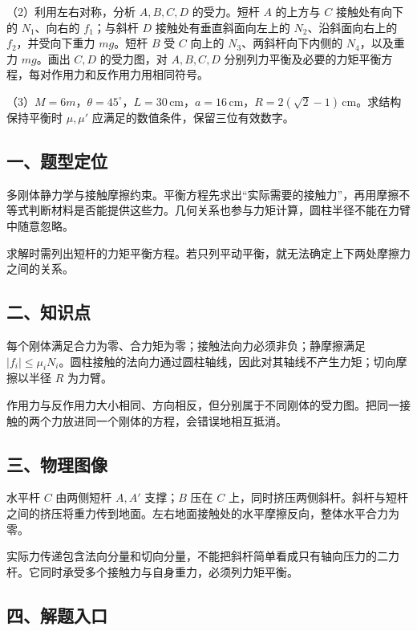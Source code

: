 \documentclass[12pt,a4paper,fontset=fandol]{ctexart}
\begin{document}
（2）利用左右对称，分析 \(A,B,C,D\) 的受力。短杆 \(A\) 的上方与 \(C\)
接触处有向下的 \(N_1\)、向右的 \(f_1\)；与斜杆 \(D\)
接触处有垂直斜面向左上的 \(N_2\)、沿斜面向右上的 \(f_2\)，并受向下重力
\(mg\)。短杆 \(B\) 受 \(C\) 向上的 \(N_3\)、两斜杆向下内侧的
\(N_4\)，以及重力 \(mg\)。画出 \(C,D\) 的受力图，对 \(A,B,C,D\)
分别列力平衡及必要的力矩平衡方程，每对作用力和反作用力用相同符号。

（3）\(M=6m\)，\(\theta=45^\circ\)，\(L=30\,\mathrm{cm}\)，\(a=16\,\mathrm{cm}\)，\(R=2(\sqrt2-1)\,\mathrm{cm}\)。求结构保持平衡时
\(\mu,\mu'\) 应满足的数值条件，保留三位有效数字。

\subsection{一、题型定位}\label{ux4e00ux9898ux578bux5b9aux4f4d-3}

多刚体静力学与接触摩擦约束。平衡方程先求出``实际需要的接触力''，再用摩擦不等式判断材料是否能提供这些力。几何关系也参与力矩计算，圆柱半径不能在力臂中随意忽略。

求解时需列出短杆的力矩平衡方程。若只列平动平衡，就无法确定上下两处摩擦力之间的关系。

\subsection{二、知识点}\label{ux4e8cux77e5ux8bc6ux70b9-3}

每个刚体满足合力为零、合力矩为零；接触法向力必须非负；静摩擦满足
\(|f_i|\le\mu_iN_i\)。圆柱接触的法向力通过圆柱轴线，因此对其轴线不产生力矩；切向摩擦以半径
\(R\) 为力臂。

作用力与反作用力大小相同、方向相反，但分别属于不同刚体的受力图。把同一接触的两个力放进同一个刚体的方程，会错误地相互抵消。

\subsection{三、物理图像}\label{ux4e09ux7269ux7406ux56feux50cf-3}

水平杆 \(C\) 由两侧短杆 \(A,A'\) 支撑；\(B\) 压在 \(C\)
上，同时挤压两侧斜杆。斜杆与短杆之间的挤压将重力传到地面。左右地面接触处的水平摩擦反向，整体水平合力为零。

实际力传递包含法向分量和切向分量，不能把斜杆简单看成只有轴向压力的二力杆。它同时承受多个接触力与自身重力，必须列力矩平衡。

\subsection{四、解题入口}\label{ux56dbux89e3ux9898ux5165ux53e3-3}
\end{document}
